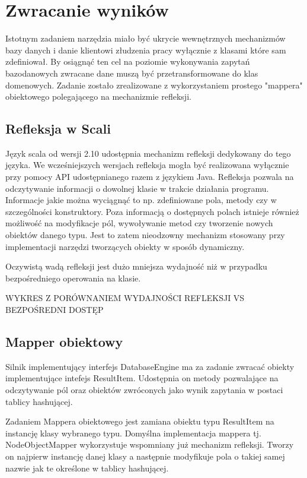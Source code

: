 \documentclass[brudnopis]{xmgr}
\begin{document}
\section{Zwracanie wyników}

Istotnym zadaniem narzędzia miało być ukrycie wewnętrznych mechanizmów bazy danych i danie klientowi złudzenia pracy wyłącznie z klasami które sam zdefiniował. By osiągnąć ten cel na poziomie wykonywania zapytań bazodanowych zwracane dane muszą być przetransformowane do klas domenowych. Zadanie zostało zrealizowane z wykorzystaniem prostego "mappera" obiektowego polegającego na mechanizmie refleksji.

\subsection{Refleksja w Scali}

Język scala od wersji 2.10 udostępnia mechanizm refleksji dedykowany do tego języka. We wcześniejszych wersjach refleksja mogła być realizowana wyłącznie przy pomocy API udostępnianego razem z językiem Java. Refleksja pozwala na odczytywanie informacji o dowolnej klasie w trakcie działania programu. Informacje jakie można wyciągnąć to np. zdefiniowane pola, metody czy w szczególności konstruktory. Poza informacją o dostępnych polach istnieje również możliwość na modyfikacje pól, wywoływanie metod czy tworzenie nowych obiektów danego typu. Jest to zatem nieodzowny mechanizm stosowany przy implementacji narzędzi tworzących obiekty w sposób dynamiczny.

Oczywistą wadą refleksji jest dużo mniejsza wydajność niż w przypadku bezpośredniego operowania na klasie.

WYKRES Z PORÓWNANIEM WYDAJNOŚCI REFLEKSJI VS BEZPOŚREDNI DOSTĘP

\subsection{Mapper obiektowy}

Silnik implementujący interfejs DatabaseEngine ma za zadanie zwracać obiekty implementujące intefejs ResultItem. Udostępnia on metody pozwalające na odczytywanie pól oraz obiektów zwróconych jako wynik zapytania w postaci tablicy hashującej. 

Zadaniem Mappera obiektowego jest zamiana obiektu typu ResultItem na instancję klasy wybranego typu. Domyślna implementacja mappera tj. NodeObjectMapper wykorzystuje wspomniany już mechanizm refleksji. Tworzy on najpierw instancję danej klasy a następnie modyfikuje pola o takiej samej nazwie jak te określone w tablicy hashującej.
\end{document}
